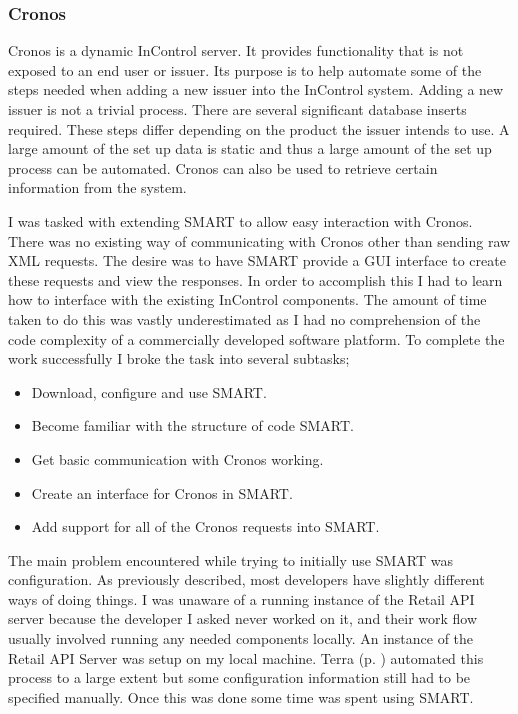 \documentclass[a4paper, 11pt, titlepage]{article}
\begin{document}
 
\subsubsection{Cronos} 
Cronos is a dynamic InControl server. It provides functionality that is not exposed to an end user or issuer. Its purpose is to help automate some of the steps needed when adding a new issuer into the InControl system. Adding a new issuer is not a trivial process. There are several significant database inserts required. These steps differ depending on the product the issuer intends to use. A large amount of the set up data is static and thus a large amount of the set up process can be automated. Cronos can also be used to retrieve certain information from the system. 

I was tasked with extending SMART to allow easy interaction with Cronos. There was no existing way of communicating with Cronos other than sending raw XML requests. The desire was to have SMART provide a GUI interface to create these requests and view the responses. 
In order to accomplish this I had to learn how to interface with the existing InControl components. The amount of time taken to do this was vastly underestimated as I had no comprehension of the code complexity of a commercially developed software platform. To complete the work successfully I broke the task into several subtasks; \
\begin{itemize} 
\item Download, configure and use SMART.
\item Become familiar with the structure of code SMART. 
\item Get basic communication with Cronos working. 
\item Create an interface for Cronos in SMART. 
\item Add support for all of the Cronos requests into SMART. 
\end{itemize} 
The main problem encountered while trying to initially use SMART was configuration. As previously described, most developers have slightly different ways of doing things. I was unaware of a running instance of the Retail API server because the developer I asked never worked on it, and their work flow usually involved running any needed components locally. An instance of the Retail API Server was setup on my local machine. Terra (p. \pageref{Terra} ) automated this process to a large extent but some configuration information still had to be specified manually. Once this was done some time was spent using SMART.  
 
\end{document}
